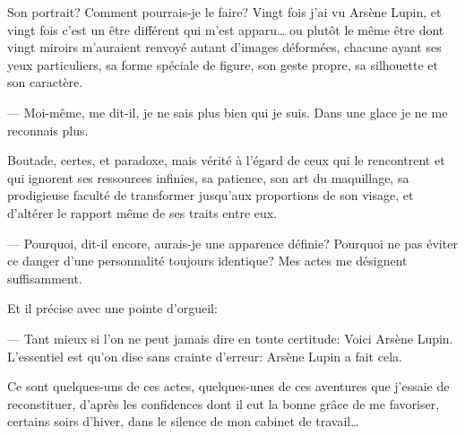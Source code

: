 \documentclass[12pt,a4paper]{book}
\begin{document}
Son portrait? Comment pourrais-je le faire? Vingt fois j’ai vu Arsène Lupin, et vingt fois c’est un être différent qui m’est apparu… ou plutôt le même être dont vingt miroirs m’auraient renvoyé autant d’images déformées, chacune ayant ses yeux particuliers, sa forme spéciale de figure, son geste propre, sa silhouette et son caractère.

— Moi-même, me dit-il, je ne sais plus bien qui je suis. Dans une glace je ne me reconnais plus.

Boutade, certes, et paradoxe, mais vérité à l’égard de ceux qui le rencontrent et qui ignorent ses ressources infinies, sa patience, son art du maquillage, sa prodigieuse faculté de transformer jusqu’aux proportions de son visage, et d’altérer le rapport même de ses traits entre eux. 

— Pourquoi, dit-il encore, aurais-je une apparence définie? Pourquoi ne pas éviter ce danger d’une personnalité toujours identique? Mes actes me désignent suffisamment.

Et il précise avec une pointe d’orgueil:

— Tant mieux si l’on ne peut jamais dire en toute certitude: Voici Arsène Lupin. L’essentiel est qu’on dise sans crainte d’erreur: Arsène Lupin a fait cela.



Ce sont quelques-uns de ces actes, quelques-unes de ces aventures que j’essaie de reconstituer, d’après les confidences dont il eut la bonne grâce de me favoriser, certains soirs d’hiver, dans le silence de mon cabinet de travail…
\end{document}
